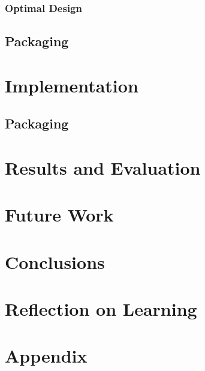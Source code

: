 \documentclass[12pt, conference, final, a4paper, onecolumn, compsoc]{IEEEtran}
\begin{document}
    \paragraph{}

    \subsubsection*{Optimal Design}
    \paragraph{}

    \subsection*{Packaging}


    \section{Implementation}
    \subsection*{}
    \subsection*{Packaging}

    \section{Results and Evaluation}
    \subsection*{}

    \section{Future Work}
    \subsection*{}

    \section{Conclusions}
    \subsection*{}

    \section{Reflection on Learning}
    \subsection*{}

    \section{Appendix}
     

  
\end{document}
